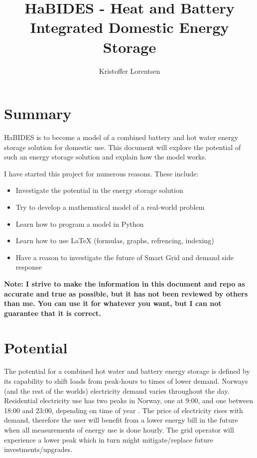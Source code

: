 \documentclass[11pt]{article} %
\title{HaBIDES - Heat and Battery Integrated Domestic Energy Storage}
\author{Kristoffer Lorentsen}
\begin{document}
\maketitle

\tableofcontents

\section{Summary}

HaBIDES is to become a model of a combined battery and hot water energy storage solution for domestic use. This document will explore the potential of such an energy storage solution and explain how the model works.

I have started this project for numerous reasons. These include:

\begin{itemize}
	\item Investigate the potential in the energy storage solution
	\item Try to develop a mathematical model of a real-world problem
	\item Learn how to program a model in Python
	\item Learn how to use LaTeX (formulas, graphs, refrencing, indexing)
	\item Have a reason to investigate the future of Smart Grid and demand side response
\end{itemize}

\textbf{Note: I strive to make the information in this document and repo as accurate and true as possible, but it has not been reviewed by others than me. You can use it for whatever you want, but I can not guarantee that it is correct.}

\section{Potential}

The potential for a combined hot water and battery energy storage is defined by its capability to shift loads from peak-hours to times of lower demand. Norways (and the rest of the worlds) electricity demand varies throughout the day. Residential electricity use has two peaks in Norway, one at 9:00, and one between 18:00 and 23:00, depending on time of year \cite{TEricson2008}. The price of electricity rises with demand, therefore the user will benefit from a lower energy bill in the future when all measurements of energy use is done hourly\cite{AMSforskriften}. The grid operator will experience a lower peak which in turn might mitigate/replace future investments/upgrades.
\end{document}
